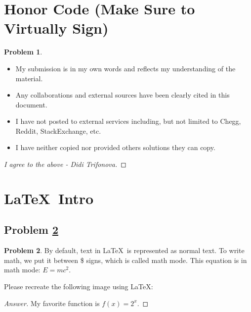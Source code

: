 \documentclass[11pt]{article}
\theoremstyle{definition}
\theoremstyle{definition}
\newtheorem{required}{Problem}
\theoremstyle{definition}
\begin{document}
\section{Honor Code (Make Sure to Virtually Sign)} \label{HonorCode}

\begin{required}
\begin{itemize}
\item My submission is in my own words and reflects my understanding of the material.
\item Any collaborations and external sources have been clearly cited in this document.
\item I have not posted to external services including, but not limited to Chegg, Reddit, StackExchange, etc.
\item I have neither copied nor provided others solutions they can copy.
\end{itemize}

\end{required}

\begin{proof}[I agree to the above - Didi Trifonova]
\end{proof}


\newpage
\section{\LaTeX\ Intro}

\subsection{Problem \ref{Latex1}}
\begin{required} \label{Latex1}
By default, text in \LaTeX\ is represented as normal text. To write math, we put it between \$ signs, which is called math mode.
This equation is in math mode: $E=mc^2$.

Please recreate the following image using \LaTeX:

\end{required}

\begin{proof}[Answer]
My favorite function is $f(x) = 2^x$.
\end{proof}
\end{document}
